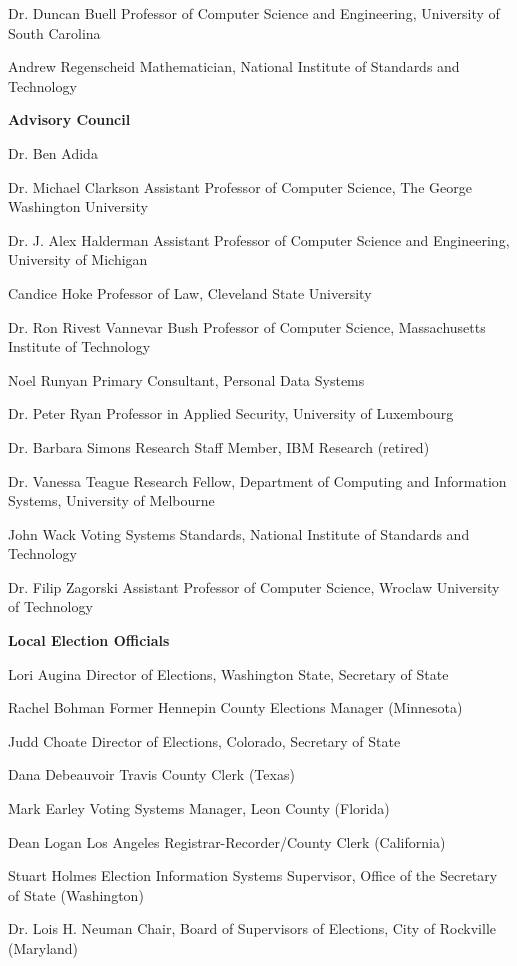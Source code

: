 Dr. Duncan Buell
Professor of Computer Science and Engineering, University of South Carolina
 
Andrew Regenscheid
Mathematician, National Institute of Standards and Technology
 
\textbf{Advisory Council}

Dr. Ben Adida
 
Dr. Michael Clarkson
Assistant Professor of Computer Science, The George Washington University
 
Dr. J. Alex Halderman
Assistant Professor of Computer Science and Engineering, University of Michigan
 
Candice Hoke
Professor of Law, Cleveland State University
 
Dr. Ron Rivest
Vannevar Bush Professor of Computer Science, Massachusetts Institute of Technology
 
Noel Runyan
Primary Consultant, Personal Data Systems
 
Dr. Peter Ryan
Professor in Applied Security, University of Luxembourg
 
Dr. Barbara Simons
Research Staff Member, IBM Research (retired)
 
Dr. Vanessa Teague
Research Fellow, Department of Computing and Information Systems, University of Melbourne
 
John Wack
Voting Systems Standards, National Institute of Standards and Technology
 
Dr. Filip Zagorski
Assistant Professor of Computer Science, Wroclaw University of Technology
 
\textbf{Local Election Officials}

Lori Augina
Director of Elections, Washington State, Secretary of State

Rachel Bohman
Former Hennepin County Elections Manager (Minnesota)

Judd Choate
Director of Elections, Colorado, Secretary of State

Dana Debeauvoir
Travis County Clerk (Texas)
 
Mark Earley
Voting Systems Manager, Leon County (Florida)
 
Dean Logan
Los Angeles Registrar-Recorder/County Clerk (California)

Stuart Holmes
Election Information Systems Supervisor, Office of the Secretary of State (Washington)
 
Dr. Lois H. Neuman
Chair, Board of Supervisors of Elections, City of Rockville (Maryland)
 
